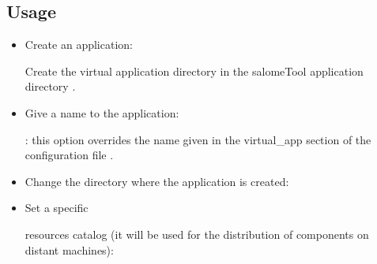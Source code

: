 \documentclass[a4paper,10pt,english]{sphinxmanual}
\begin{document}
\subsection{Usage}
\label{\detokenize{commands/application:usage}}\begin{itemize}
\item {} 
Create an application:

%
\begin{sphinxVerbatim}[commandchars=\\\{\}]
  
\end{sphinxVerbatim}

Create the virtual application directory in the salomeTool application directory .

\item {} 
Give a name to the application:

%
\begin{sphinxVerbatim}[commandchars=\\\{\}]
    
\end{sphinxVerbatim}

: this option overrides the name given in the virtual\_app section of the configuration file .

\item {} 
Change the directory where the application is created:

%
\begin{sphinxVerbatim}[commandchars=\\\{\}]
    
\end{sphinxVerbatim}

\item {} 
Set a specific %
\begin{footnote}[8]\sphinxAtStartFootnote
{}
%
\end{footnote} resources catalog (it will be used for the distribution of components on distant machines):


\end{itemize}
\end{document}
